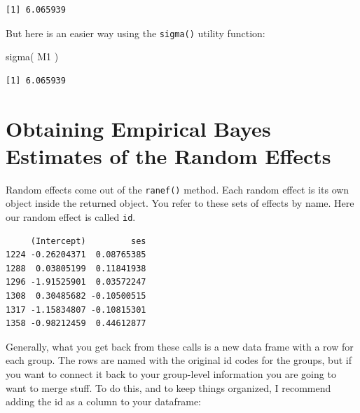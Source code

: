 \documentclass[
  letterpaper,
  DIV=11,
  numbers=noendperiod]{scrreprt}
\newenvironment{Shaded}{\begin{snugshade}}{\end{snugshade}}
\newcommand{\FunctionTok}[1]{\textcolor[rgb]{0.02,0.16,0.49}{#1}}
\newcommand{\NormalTok}[1]{\textcolor[rgb]{0.00,0.44,0.13}{#1}}
\newcommand{\OtherTok}[1]{\textcolor[rgb]{0.00,0.44,0.13}{#1}}
\newcommand{\SpecialCharTok}[1]{\textcolor[rgb]{0.25,0.44,0.63}{#1}}
\newcommand{\StringTok}[1]{\textcolor[rgb]{0.25,0.44,0.63}{#1}}
\begin{document}
\begin{verbatim}
[1] 6.065939
\end{verbatim}

But here is an easier way using the \texttt{sigma()} utility function:

\begin{Shaded}
\begin{Highlighting}[]
\FunctionTok{sigma}\NormalTok{( M1 )}
\end{Highlighting}
\end{Shaded}

\begin{verbatim}
[1] 6.065939
\end{verbatim}

\hypertarget{obtaining-empirical-bayes-estimates-of-the-random-effects-1}{%
\section{Obtaining Empirical Bayes Estimates of the Random
Effects}\label{obtaining-empirical-bayes-estimates-of-the-random-effects-1}}

Random effects come out of the \texttt{ranef()} method. Each random
effect is its own object inside the returned object. You refer to these
sets of effects by name. Here our random effect is called \texttt{id}.

\begin{Shaded}
\end{Shaded}

\begin{verbatim}
     (Intercept)         ses
1224 -0.26204371  0.08765385
1288  0.03805199  0.11841938
1296 -1.91525901  0.03572247
1308  0.30485682 -0.10500515
1317 -1.15834807 -0.10815301
1358 -0.98212459  0.44612877
\end{verbatim}

Generally, what you get back from these calls is a new data frame with a
row for each group. The rows are named with the original id codes for
the groups, but if you want to connect it back to your group-level
information you are going to want to merge stuff. To do this, and to
keep things organized, I recommend adding the id as a column to your
dataframe:

\begin{Shaded}
\end{Shaded}
\end{document}
